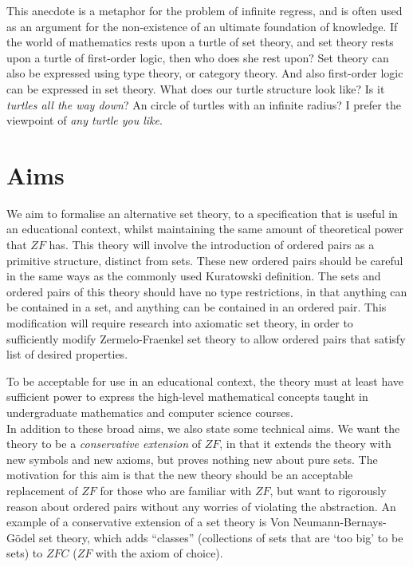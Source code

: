 \documentclass[11pt]{report}
\theoremstyle{definition}
\theoremstyle{theorem}
\theoremstyle{lemma}
\begin{document}
This anecdote is a metaphor for the problem of infinite regress, and is often used as an argument for the non-existence of an ultimate foundation of knowledge. 
If the world of mathematics rests upon a turtle of set theory, and set theory rests upon a turtle of first-order logic, then who does she rest upon? 
Set theory can also be expressed using type theory, or category theory. And also first-order logic can be expressed in set theory.
What does our turtle structure look like? 
Is it \emph{turtles all the way down}? 
An circle of turtles with an infinite radius?
I prefer the viewpoint of \emph{any turtle you like}. 

\section{Aims}
We aim to formalise an alternative set theory, to a specification that is useful in an educational context, whilst maintaining the same amount of theoretical power that $\mathit{ZF}$ has.
This theory will involve the introduction of ordered pairs as a primitive structure, distinct from sets.
These new ordered pairs should be careful in the same ways as the commonly used Kuratowski definition.
The sets and ordered pairs of this theory should have no type restrictions, in that anything can be contained in a set, and anything can be contained in an ordered pair.
This modification will require research into axiomatic set theory, in order to sufficiently modify Zermelo-Fraenkel set theory to allow ordered pairs that satisfy list of desired properties.

To be acceptable for use in an educational context, the theory must at least have sufficient power to express the high-level mathematical concepts taught in undergraduate mathematics and computer science courses.\\

In addition to these broad aims, we also state some technical aims. 
We want the theory to be a \emph{conservative extension} of $\mathit{ZF}$, in that it extends the theory with new symbols and new axioms, but proves nothing new about pure sets.
The motivation for this aim is that the new theory should be an acceptable replacement of $\mathit{ZF}$ for those who are familiar with $\mathit{ZF}$, but want to rigorously reason about ordered pairs without any worries of violating the abstraction.
An example of a conservative extension of a set theory is Von Neumann-Bernays-G\"odel set theory, which adds ``classes'' (collections of sets that are `too big' to be sets) to $\mathit{ZFC}$ ($\mathit{ZF}$ with the axiom of choice). 
\end{document}
